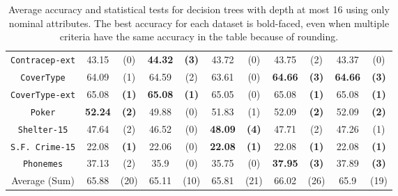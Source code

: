 \begin{table}
\begin{tabular}{c|cc|cc|cc|cc|cc}
{\tt Contracep-ext} &  43.15       & (0)          &  {\bf 44.32} & {\bf (3)}    &  43.72       & (0)              & 43.75      & (2)          & 43.37      & (0)        \\
{\tt CoverType}     &  64.09       & (1)          &  64.59       & (2)          &  63.61       & (0)              &{\bf 64.66} & {\bf (3)}    & {\bf 64.66}& {\bf (3)}  \\
{\tt CoverType-ext} &  65.08       & {\bf (1)}    &  {\bf 65.08} & {\bf (1)}    &  65.05       & (0)              & 65.08      & {\bf (1)}    & 65.08      & {\bf (1)}  \\
{\tt Poker}         &  {\bf 52.24} & {\bf (2)}    &  49.88       & (0)          &  51.83       & (1)              & 52.09      & {\bf (2)}    & 52.09      & {\bf (2)}  \\
{\tt Shelter-15}    &  47.64       & (2)          &  46.52       & (0)          & {\bf 48.09}  & {\bf (4)}        & 47.71      & (2)          & 47.26      & (1)        \\
{\tt S.F. Crime-15} &  22.08       & {\bf (1)}    &  22.06       & (0)          & {\bf 22.08}  & {\bf (1)}        & 22.08      & {\bf (1)}    & 22.08      & {\bf (1)}  \\
{\tt Phonemes}      &  37.13       & (2)          &  35.9        & (0)          & 35.75        & (0)              &{\bf 37.95} & {\bf (3)}    & 37.89      & {\bf (3)}  \\
\hline
Average (Sum)       &  65.88       & (20)         &  65.11       & (10)         & 65.81        & (21)             &  66.02     & (26)         & 65.9       & (19)
\end{tabular}
\normalsize
\caption{Average accuracy and statistical tests  for  decision trees with depth at most 16 using only nominal attributes. The best accuracy for each dataset is bold-faced, even when multiple criteria have the same accuracy in the table because of rounding.}
\label{tab:nominal-16}
\end{table}

